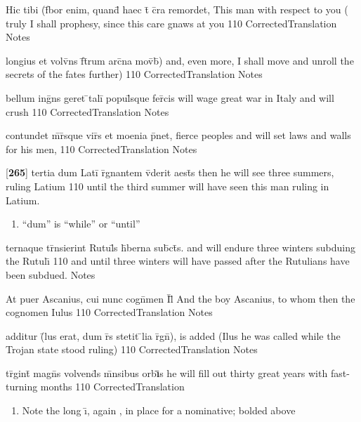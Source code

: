 \latline
  {Hic tibi (f\={}bor enim, quand\={} haec t\={} c\={}ra remordet,}
  { This man with respect to you ( truly I shall prophesy, since this care gnaws at you }
  {110}
  { CorrectedTranslation }
  { Notes }


\latline
  {longius et volv\={}ns f\={}t\={}rum arc\={}na mov\={}b\={})}
  { and, even more, I shall move and unroll the secrets of the fates further) }
  {110}
  { CorrectedTranslation }
  { Notes }


\latline
  {bellum ing\={}ns geret \={}tali\={} popul\={}sque fer\={}cis}
  { will wage great war in Italy and will crush }
  {110}
  { CorrectedTranslation }
  { Notes }


\latline
  {contundet m\={}r\={}sque vir\={\macron {\i}}s et moenia p\={}net,}
  { fierce peoples and will set laws and walls for his men,  }
  {110}
  { CorrectedTranslation }
  { Notes }


\latline
  {[\textbf{265}] tertia dum Lati\={} r\={}gnantem v\={\macron {\i}}derit aest\={}s}
  { then he will see three summers, ruling Latium }
  {110}
  { until the third summer will have seen this man ruling in Latium. }
  { \begin{enumerate}
  	\item ``dum'' is ``while'' or ``until''
  \end{enumerate} }


\latline
  {ternaque tr\={}nsierint Rutul\={\macron {\i}}s h\={\macron {\i}}berna sub\={}ct\={\macron {\i}}s.}
  { and will endure three winters subduing the Rutul\={\i} }
  {110}
  { and until three winters will have passed after the Rutulians have been subdued. }
  { Notes }


\latline
  {At puer Ascanius, cui nunc cogn\={}men I\={}l\={}}
  { And the boy Ascanius, to whom then the cognomen Iulus  }
  {110}
  { CorrectedTranslation }
  { Notes }


\latline
  {additur (\={}lus erat, dum r\={}s stetit \={}lia r\={}gn\={}),}
  { is added (Ilus he was called while the Trojan state stood ruling) }
  {110}
  { CorrectedTranslation }
  { Notes }


\latline
  {tr\={\macron {\i}}gint\={} magn\={}s volvend\={\macron {\i}}s m\={}nsibus orb\textbf{\={\i}}s}
  { he will fill out thirty great years with fast-turning months  }
  {110}
  { CorrectedTranslation }
  { \begin{enumerate}
  	\item Note the long \={\i}, again , in place for a nominative; bolded above
  \end{enumerate} }


